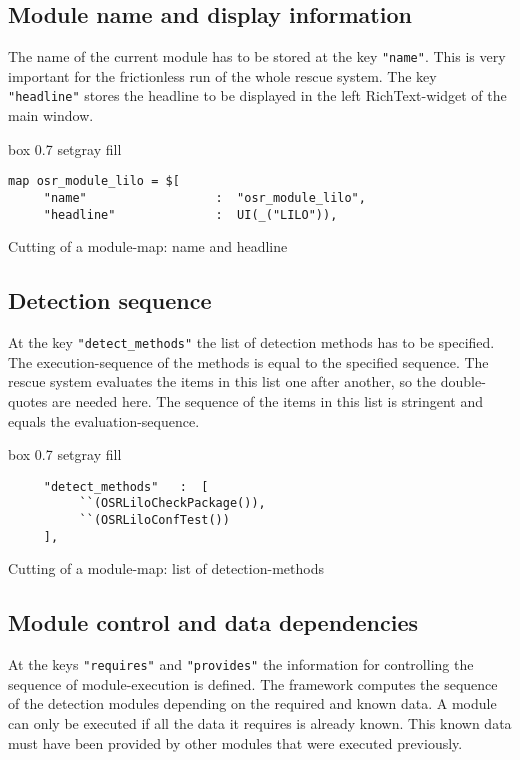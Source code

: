 \subsection{Module name and display information}
The name of the current module has to be stored at the key \verb+"name"+.
This is very important for the frictionless run of the whole rescue system.
The key \verb+"headline"+ stores the headline to be displayed in the left
RichText-widget of the main window.

\begin{program}[h!]
\begin{boxitpara}{box 0.7 setgray fill}
{\footnotesize \begin{verbatim}
map osr_module_lilo = $[
     "name"                  :  "osr_module_lilo",
     "headline"              :  UI(_("LILO")),
\end{verbatim}}%
\end{boxitpara}
\caption{Cutting of a module-map: name and headline}
\end{program}

\subsection{Detection sequence}
At the key \verb+"detect_methods"+ the list of detection methods has to
be specified. The execution-sequence of the methods is equal to the 
specified sequence. The rescue system evaluates the items in this list
one after another, so the double-quotes are needed here. The sequence of
the items in this list is stringent and equals the evaluation-sequence.

\begin{program}[h!]
\begin{boxitpara}{box 0.7 setgray fill}
{\footnotesize \begin{verbatim}
     "detect_methods"   :  [
          ``(OSRLiloCheckPackage()),
          ``(OSRLiloConfTest())
     ],
\end{verbatim}}
\end{boxitpara}
\caption{Cutting of a module-map: list of detection-methods}
\label{detect_methods}
\end{program}

\subsection{Module control and data dependencies}
At the keys \verb+"requires"+ and \verb+"provides"+ the information for
controlling the sequence of module-execution is defined. The framework
computes the sequence of the detection modules depending on the required
and known data. A module can only be executed if all the data it requires
is already known. This known data must have been provided by other modules
that were executed previously.\\

